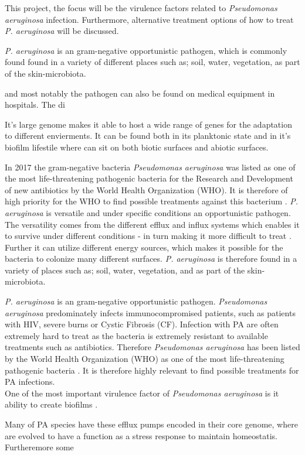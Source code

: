This project, the focus will be the virulence factors related to \textit{Pseudomonas aeruginosa} infection. Furthermore, alternative treatment options of how to treat \textit{P. aeruginosa} will be discussed. 





\textit{P. aeruginosa} is an gram-negative opportunistic pathogen, which is commonly found found in a variety of different places such as; soil, water, vegetation, as part of the skin-microbiota.

and most notably the pathogen can also be found on medical equipment in hospitals. The di


It's large genome makes it able to host a wide range of genes for the adaptation to different envierments.  It can be found both in its planktonic state and in it's biofilm lifestile where can sit on both biotic surfaces and abiotic surfaces. 


In 2017 the gram-negative bacteria \textit{Pseudomonas aeruginosa} was listed as one of the most life-threatening pathogenic bacteria for the Research and Development of new antibiotics by the World Health Organization (WHO). It is therefore of high priority for the WHO to find possible treatments against this bacterium \cite{Pachori2019EmergenceReview}. \textit{P. aeruginosa} is versatile and under specific conditions an opportunistic pathogen. The versatility comes from  the different efflux and influx systems which enables it to survive under different conditions - in turn making it more difficult to treat \cite{Mastropasqua2018EfficientLung} \cite{Lyczak2000EstablishmentOpportunist}. Further it can utilize different energy sources, which makes it possible for the bacteria to colonize many different surfaces. \textit{P. aeruginosa} is therefore found in a variety of places such as; soil, water, vegetation, and as part of the skin-microbiota. 


\textit{P. aeruginosa} is an gram-negative opportunistic pathogen. \textit{Pseudomonas aeruginosa} predominately infects immunocompromised patients, such as patients with HIV, severe burns or Cystic Fibrosis (CF)\cite{Thi2020PseudomonasBiofilms}. Infection with PA are often extremely hard to treat as the bacteria is extremely resistant to available treatments such as antibiotics. Therefore \textit{Pseudomonas aeruginosa} has been listed by the World Health Organization (WHO) as one of the most life-threatening pathogenic bacteria \cite{Pachori2019EmergenceReview}. It is therefore highly relevant to find possible treatments for PA infections.\\

One of the most important virulence factor of \textit{Pseudomonas aeruginosa} is it ability to create biofilms \cite{Al-Bakri2019Photothermal-inducedBiofilm}.



Many of PA species have these efflux pumps encoded in their core genome, where are evolved to have a function as a stress response to maintain homeostatis. Furtheremore some 